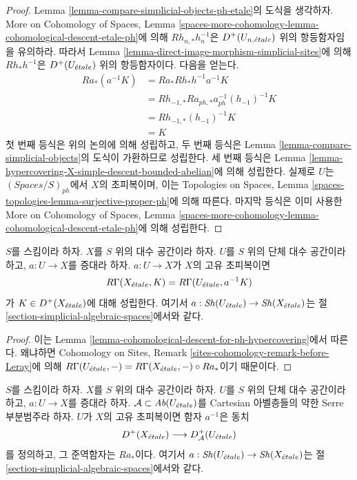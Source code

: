 \begin{proof}
Lemma \ref{lemma-compare-simplicial-objects-ph-etale}의 도식을 생각하자.
More on Cohomology of Spaces, Lemma
\ref{spaces-more-cohomology-lemma-cohomological-descent-etale-ph}에 의해
$Rh_{n, *}h_n^{-1}$은 $D^+(U_{n, {\acute{e}tale}})$ 위의 항등함자임을 유의하라.
따라서 Lemma \ref{lemma-direct-image-morphism-simplicial-sites}에 의해
$Rh_*h^{-1}$은 $D^+(U_{\acute{e}tale})$ 위의 항등함자이다. 다음을 얻는다.
\begin{align*}
Ra_*(a^{-1}K)
& =
Ra_*Rh_*h^{-1}a^{-1}K \\
& =
Rh_{-1, *}Ra_{ph, *}a_{ph}^{-1}(h_{-1})^{-1}K \\
& =
Rh_{-1, *}(h_{-1})^{-1}K \\
& =
K
\end{align*}
첫 번째 등식은 위의 논의에 의해 성립하고, 두 번째 등식은
Lemma \ref{lemma-compare-simplicial-objects}의 도식이 가환하므로
성립한다. 세 번째 등식은 Lemma
\ref{lemma-hypercovering-X-simple-descent-bounded-abelian}에 의해
성립한다. 실제로 $U$는 $(\textit{Spaces}/S)_{ph}$에서 $X$의
초피복이며, 이는 Topologies on Spaces, Lemma
\ref{spaces-topologies-lemma-surjective-proper-ph}에 의해 따른다.
마지막 등식은 이미 사용한
More on Cohomology of Spaces, Lemma
\ref{spaces-more-cohomology-lemma-cohomological-descent-etale-ph}에 의해
성립한다.
\end{proof}

\begin{lemma}
\label{lemma-compute-via-ph-hypercovering}
$S$를 스킴이라 하자. $X$를 $S$ 위의 대수 공간이라 하자.
$U$를 $S$ 위의 단체 대수 공간이라 하고, $a : U \to X$를
증대라 하자. $a : U \to X$가 $X$의 고유 초피복이면
$$
R\Gamma(X_{\acute{e}tale}, K) = R\Gamma(U_{\acute{e}tale}, a^{-1}K)
$$
가 $K \in D^+(X_{\acute{e}tale})$에 대해 성립한다.
여기서 $a : \mathop{\mathit{Sh}}\nolimits(U_{\acute{e}tale}) \to \mathop{\mathit{Sh}}\nolimits(X_{\acute{e}tale})$는 절
\ref{section-simplicial-algebraic-spaces}에서와 같다.
\end{lemma}

\begin{proof}
이는 Lemma \ref{lemma-cohomological-descent-for-ph-hypercovering}에서
따른다. 왜냐하면 Cohomology on Sites, Remark
\ref{sites-cohomology-remark-before-Leray}에 의해
$R\Gamma(U_{\acute{e}tale}, -) = R\Gamma(X_{\acute{e}tale}, -) \circ Ra_*$이기 때문이다.
\end{proof}

\begin{lemma}
\label{lemma-ph-hypercovering-equivalence-bounded}
$S$를 스킴이라 하자. $X$를 $S$ 위의 대수 공간이라 하자.
$U$를 $S$ 위의 단체 대수 공간이라 하고, $a : U \to X$를
증대라 하자. $\mathcal{A} \subset \textit{Ab}(U_{\acute{e}tale})$를
Cartesian 아벨층들의 약한 Serre 부분범주라 하자.
$U$가 $X$의 고유 초피복이면 함자 $a^{-1}$은 동치
$$
D^+(X_{\acute{e}tale}) \longrightarrow D_\mathcal{A}^+(U_{\acute{e}tale})
$$
를 정의하고, 그 준역함자는 $Ra_*$이다. 여기서
$a : \mathop{\mathit{Sh}}\nolimits(U_{\acute{e}tale}) \to \mathop{\mathit{Sh}}\nolimits(X_{\acute{e}tale})$는 절
\ref{section-simplicial-algebraic-spaces}에서와 같다.
\end{lemma}


